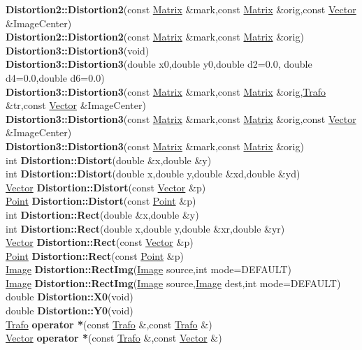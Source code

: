 \documentclass[10pt,titlepage]{article}
\def\functionlistentry#1#2#3#4#5#6{\noindent #1 {\bf #2}(#3) \dotfill #6\\}
\begin{document}
{{\functionlistentry{}{Distortion2::Distortion2}{const \hyperlink{Matrix}{Matrix} \&mark,const \hyperlink{Matrix}{Matrix} \&orig,const \hyperlink{Vector}{Vector} \&ImageCenter}{743}{geoTrafo}{}
\functionlistentry{}{Distortion2::Distortion2}{const \hyperlink{Matrix}{Matrix} \&mark,const \hyperlink{Matrix}{Matrix} \&orig}{744}{geoTrafo}{}
\functionlistentry{}{Distortion3::Distortion3}{void}{731}{geoTrafo}{}
\functionlistentry{}{Distortion3::Distortion3}{double x0,double y0,double d2=0.0, double d4=0.0,double d6=0.0}{735}{geoTrafo}{}
\functionlistentry{}{Distortion3::Distortion3}{const \hyperlink{Matrix}{Matrix} \&mark,const \hyperlink{Matrix}{Matrix} \&orig,\hyperlink{Trafo}{Trafo} \&tr,const \hyperlink{Vector}{Vector} \&ImageCenter}{745}{geoTrafo}{}
\functionlistentry{}{Distortion3::Distortion3}{const \hyperlink{Matrix}{Matrix} \&mark,const \hyperlink{Matrix}{Matrix} \&orig,const \hyperlink{Vector}{Vector} \&ImageCenter}{746}{geoTrafo}{}
\functionlistentry{}{Distortion3::Distortion3}{const \hyperlink{Matrix}{Matrix} \&mark,const \hyperlink{Matrix}{Matrix} \&orig}{747}{geoTrafo}{}
\functionlistentry{int}{Distortion::Distort}{double \&x,double \&y}{759}{geoTrafo}{}
\functionlistentry{int}{Distortion::Distort}{double x,double y,double \&xd,double \&yd}{760}{geoTrafo}{}
\functionlistentry{\hyperlink{Vector}{Vector}}{Distortion::Distort}{const \hyperlink{Vector}{Vector} \&p}{761}{geoTrafo}{}
\functionlistentry{\hyperlink{Point}{Point}}{Distortion::Distort}{const \hyperlink{Point}{Point} \&p}{762}{geoTrafo}{}
\functionlistentry{int}{Distortion::Rect}{double \&x,double \&y}{763}{geoTrafo}{}
\functionlistentry{int}{Distortion::Rect}{double x,double y,double \&xr,double \&yr}{764}{geoTrafo}{}
\functionlistentry{\hyperlink{Vector}{Vector}}{Distortion::Rect}{const \hyperlink{Vector}{Vector} \&p}{765}{geoTrafo}{}
\functionlistentry{\hyperlink{Point}{Point}}{Distortion::Rect}{const \hyperlink{Point}{Point} \&p}{766}{geoTrafo}{}
\functionlistentry{\hyperlink{Image}{Image}}{Distortion::RectImg}{\hyperlink{Image}{Image} source,int mode=DEFAULT}{767}{geoTrafo}{}
\functionlistentry{\hyperlink{Image}{Image}}{Distortion::RectImg}{\hyperlink{Image}{Image} source,\hyperlink{Image}{Image} dest,int mode=DEFAULT}{768}{geoTrafo}{}
\functionlistentry{double}{Distortion::X0}{void}{748}{geoTrafo}{}
\functionlistentry{double}{Distortion::Y0}{void}{749}{geoTrafo}{}
\functionlistentry{\hyperlink{Trafo}{Trafo}}{operator *}{const \hyperlink{Trafo}{Trafo} \&,const \hyperlink{Trafo}{Trafo} \&}{687}{geoTrafo}{}
\functionlistentry{\hyperlink{Vector}{Vector}}{operator *}{const \hyperlink{Trafo}{Trafo} \&,const \hyperlink{Vector}{Vector} \&}{688}{geoTrafo}{}
}}
\end{document}
